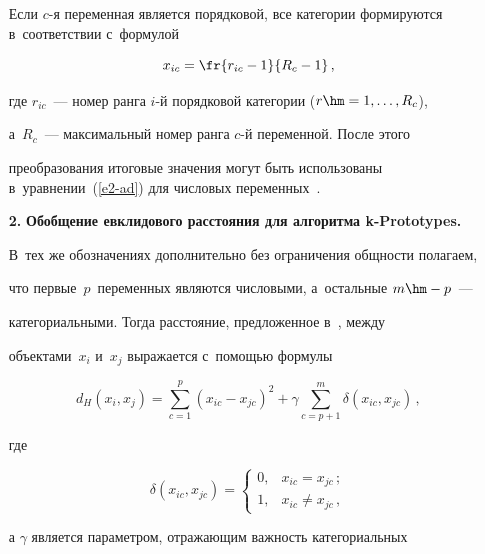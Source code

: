 \begin{itemize}
  


  Если $c$-я переменная является порядковой, все категории формируются в~соответствии с~формулой


  \begin{equation*}


  x_{ic}= \fr{r_{ic}-1}{R_c-1}\,,




  \end{equation*}


где $r_{ic}$~--- номер ранга $i$-й порядковой категории ($r \hm= 1, \ldots, R_c$), 


а~$R_c$~--- максимальный номер ранга $c$-й переменной. После этого 


преобразования итоговые значения могут быть использованы в~уравнении~(\ref{e2-ad}) для числовых переменных~\cite{14-ad}.


  \item[\textbf{2.}] \textbf{Обобщение евклидового расстояния для алгоритма k-Prototypes.} 


В~тех же обозначениях дополнительно без ограничения общности полагаем, 


что первые~$p$~переменных являются чис\-ло\-вы\-ми, а~остальные $m\hm-p$~--- 


категориальными. Тогда расстояние, предложенное в~\cite{15-ad}, между 


объектами~$x_i$ и~$x_j$ выражается с~по\-мощью формулы


  \begin{equation}


  d_H(x_i,x_j) =\sum\limits^p_{c=1} (x_{ic}-x_{jc})^2+\gamma 


\sum\limits^m_{c=p+1} \delta \left( x_{ic}, x_{jc}\right)\,,


  \label{e4-ad}


  \end{equation}


  где 


  $$


  \delta\left( x_{ic}, x_{jc}\right) =\begin{cases}


  0, & x_{ic}=x_{jc}\,;\\


  1, & x_{ic} \not=x_{jc}\,,


  \end{cases}


  $$


а $\gamma$ является параметром, отражающим важность категориальных 



\end{itemize}
